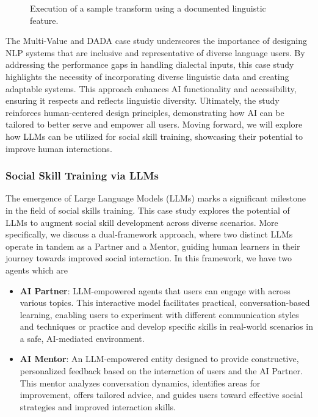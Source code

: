 \documentclass[
  letterpaper,
  numbers=noenddot,
  DIV=11,
  oneside]{scrreprt}
\theoremstyle{remark}
\begin{document}
\begin{figure}


\caption{\label{fig-dada_performance}Execution of a sample transform
using a documented linguistic feature.}

\end{figure}%

The Multi-Value and DADA case study underscores the importance of
designing NLP systems that are inclusive and representative of diverse
language users. By addressing the performance gaps in handling dialectal
inputs, this case study highlights the necessity of incorporating
diverse linguistic data and creating adaptable systems. This approach
enhances AI functionality and accessibility, ensuring it respects and
reflects linguistic diversity. Ultimately, the study reinforces
human-centered design principles, demonstrating how AI can be tailored
to better serve and empower all users. Moving forward, we will explore
how LLMs can be utilized for social skill training, showcasing their
potential to improve human interactions.

\subsubsection{Social Skill Training via
LLMs}\label{social-skill-training-via-llms}

The emergence of Large Language Models (LLMs) marks a significant
milestone in the field of social skills training. This case study
explores the potential of LLMs to augment social skill development
across diverse scenarios. More specifically, we discuss a dual-framework
approach, where two distinct LLMs operate in tandem as a Partner and a
Mentor, guiding human learners in their journey towards improved social
interaction. In this framework, we have two agents which are

\begin{itemize}
\item
  \textbf{AI Partner}: LLM-empowered agents that users can engage with
  across various topics. This interactive model facilitates practical,
  conversation-based learning, enabling users to experiment with
  different communication styles and techniques or practice and develop
  specific skills in real-world scenarios in a safe, AI-mediated
  environment.
\item
  \textbf{AI Mentor}: An LLM-empowered entity designed to provide
  constructive, personalized feedback based on the interaction of users
  and the AI Partner. This mentor analyzes conversation dynamics,
  identifies areas for improvement, offers tailored advice, and guides
  users toward effective social strategies and improved interaction
  skills.
\end{itemize}
\end{document}
